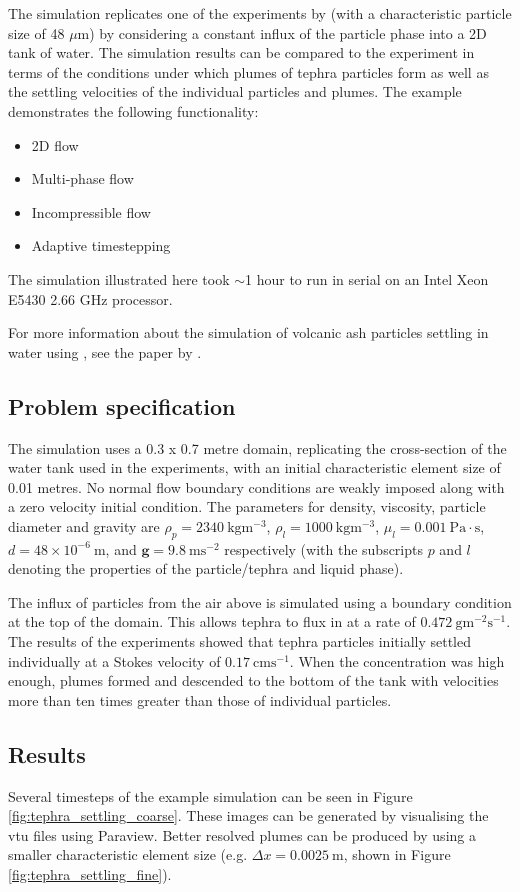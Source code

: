 The simulation replicates one of the experiments by \cite{carey1997} (with a characteristic particle size of 48 $\mu$m) by considering a constant influx of the particle phase into a 2D tank of water. The simulation results can be compared to the experiment in terms of the conditions under which plumes of tephra particles form as well as the settling velocities of the individual particles and plumes. The example demonstrates the following functionality:
\begin{itemize}
\item 2D flow
\item Multi-phase flow
\item Incompressible flow
\item Adaptive timestepping
\end{itemize}
The simulation illustrated here took $\sim$1 hour to run in serial on an Intel Xeon E5430 2.66 GHz processor.

For more information about the simulation of volcanic ash particles settling in water using \fluidity, see the paper by \cite{Jacobs_etal_2013}.

\subsection{Problem specification}
The simulation uses a 0.3 x 0.7 metre domain, replicating the cross-section of the water tank used in the experiments, with an initial characteristic element size of 0.01 metres. No normal flow boundary conditions are weakly imposed along with a zero velocity initial condition. The parameters for density, viscosity, particle diameter and gravity are $\rho_p = 2340\ \mathrm{kgm^{-3}}$, $\rho_l = 1000\ \mathrm{kgm^{-3}}$, $\mu_l = 0.001\ \mathrm{Pa\cdot s}$, $d = 48\times 10^{-6}\ \mathrm{m}$, and $\mathbf{g} = 9.8\ \mathrm{ms^{-2}}$ respectively (with the subscripts $p$ and $l$ denoting the properties of the particle/tephra and liquid phase).

The influx of particles from the air above is simulated using a  boundary condition at the top of the domain. This allows tephra to flux in at a rate of $0.472\ \mathrm{gm^{-2}s^{-1}}$. The results of the experiments showed that tephra particles initially settled individually at a Stokes velocity of $0.17\ \mathrm{cms^{-1}}$. When the concentration was high enough, plumes formed and descended to the bottom of the tank with velocities more than ten times greater than those of individual particles.

\subsection{Results}
Several timesteps of the example simulation can be seen in Figure \ref{fig:tephra_settling_coarse}. These images can be generated by visualising the vtu files using Paraview. Better resolved plumes can be produced by using a smaller characteristic element size (e.g. $\Delta x = 0.0025\ \mathrm{m}$, shown in Figure \ref{fig:tephra_settling_fine}).

